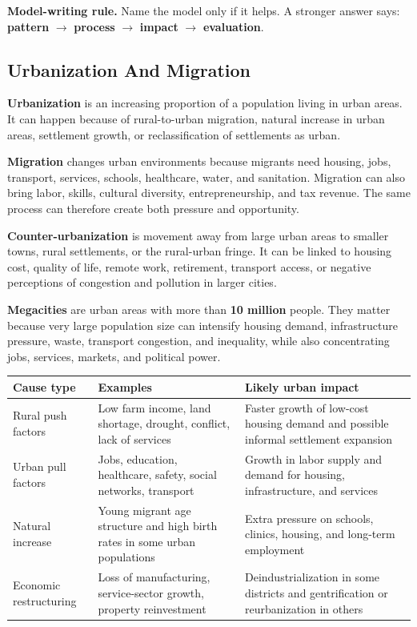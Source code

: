 \documentclass[11pt,a4paper]{article}
\newcommand{\term}[1]{\textcolor{HeadingBlue}{\textbf{#1}}}
\newcommand{\boxnote}[3]{%
\noindent\colorbox{#1}{%
  \begin{minipage}{0.965\textwidth}
  \sffamily
  \textbf{\textcolor{HeadingBlue}{#2}} #3
  \end{minipage}
}}
\begin{document}
\boxnote{SoftTint}{Model-writing rule.}{Name the model only if it helps. A
stronger answer says: \term{pattern} $\rightarrow$ \term{process}
$\rightarrow$ \term{impact} $\rightarrow$ \term{evaluation}.}

\subsection{Urbanization And Migration}

\term{Urbanization} is an increasing proportion of a population living in urban
areas. It can happen because of rural-to-urban migration, natural increase in
urban areas, settlement growth, or reclassification of settlements as urban.

\term{Migration} changes urban environments because migrants need housing,
jobs, transport, services, schools, healthcare, water, and sanitation. Migration
can also bring labor, skills, cultural diversity, entrepreneurship, and tax
revenue. The same process can therefore create both pressure and opportunity.

\term{Counter-urbanization} is movement away from large urban areas to smaller
towns, rural settlements, or the rural-urban fringe. It can be linked to
housing cost, quality of life, remote work, retirement, transport access, or
negative perceptions of congestion and pollution in larger cities.

\term{Megacities} are urban areas with more than \term{10 million} people. They
matter because very large population size can intensify housing demand,
infrastructure pressure, waste, transport congestion, and inequality, while also
concentrating jobs, services, markets, and political power.

\begin{tabularx}{\textwidth}{L{0.21\textwidth}Y Y}
\toprule
\textbf{Cause type} & \textbf{Examples} & \textbf{Likely urban impact} \\
\midrule
Rural push factors & Low farm income, land shortage, drought, conflict, lack of
services & Faster growth of low-cost housing demand and possible informal
settlement expansion \\
Urban pull factors & Jobs, education, healthcare, safety, social networks,
transport & Growth in labor supply and demand for housing, infrastructure, and
services \\
Natural increase & Young migrant age structure and high birth rates in some
urban populations & Extra pressure on schools, clinics, housing, and long-term
employment \\
Economic restructuring & Loss of manufacturing, service-sector growth,
property reinvestment & Deindustrialization in some districts and
gentrification or reurbanization in others \\
\bottomrule
\end{tabularx}
\end{document}
